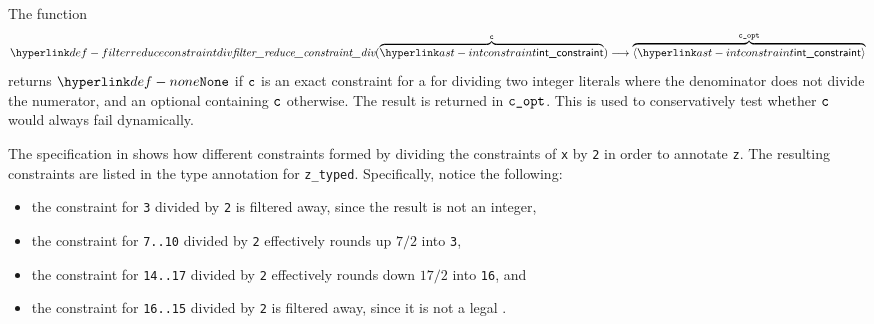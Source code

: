\begin{mathpar}
\end{mathpar}

\begin{mathpar}
\end{mathpar}

\hypertarget{def-filterreduceconstraintdiv}{}
The function
\[
\filterreduceconstraintdiv(
  \overname{\intconstraint}{\vc}) \aslto
  \overname{\langle\intconstraint\rangle}{\vcopt}
\]
returns $\None$ if $\vc$ is an exact constraint for a \binopexpressionterm{} for dividing two integer literals
where the denominator does not divide the numerator, and an optional containing $\vc$ otherwise.
The result is returned in $\vcopt$.
This is used to conservatively test whether $\vc$ would always fail dynamically.

The specification in 
shows how different constraints formed by dividing the constraints of \verb|x| by \verb|2|
in order to annotate \verb|z|.
The resulting constraints are listed in the type annotation for \verb|z_typed|.
Specifically, notice the following:
\begin{itemize}
  \item the constraint for \verb|3| divided by \verb|2| is filtered away,
        since the result is not an integer,
  \item the constraint for \verb|7..10| divided by \verb|2|
        effectively rounds up $7/2$ into \verb|3|,
  \item the constraint for \verb|14..17| divided by \verb|2| effectively rounds down
        $17/2$ into \verb|16|, and
  \item the constraint for \verb|16..15| divided by \verb|2| is filtered away,
        since it is not a legal \rangeconstraintterm.
\end{itemize}

